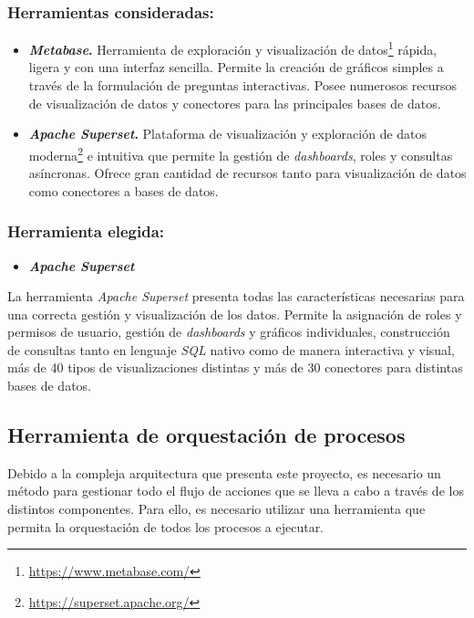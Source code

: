 \subsubsection{Herramientas consideradas:}

\begin{itemize}
    \item \textbf{\textit{Metabase}.} Herramienta de exploración y visualización de datos\footnote{\url{https://www.metabase.com/}} rápida, ligera y con una interfaz sencilla. Permite la creación de gráficos simples a través de la formulación de preguntas interactivas. Posee numerosos recursos de visualización de datos y conectores para las principales bases de datos. 
    
    \item \textbf{\textit{Apache Superset}.} Plataforma de visualización y exploración de datos moderna\footnote{\url{https://superset.apache.org/}} e intuitiva que permite la gestión de \textit{dashboards}, roles y consultas asíncronas. Ofrece gran cantidad de recursos tanto para visualización de datos como conectores a bases de datos.
\end{itemize}

\subsubsection{Herramienta elegida:}

\begin{itemize}
    \item \textbf{\textit{Apache Superset}}
\end{itemize}

La herramienta \textit{Apache Superset} presenta todas las características necesarias para una correcta gestión y visualización de los datos. Permite la asignación de roles y permisos de usuario, gestión de \textit{dashboards} y gráficos individuales, construcción de consultas tanto en lenguaje \textit{SQL} nativo como de manera interactiva y visual, más de 40 tipos de visualizaciones distintas y más de 30 conectores para distintas bases de datos.

\subsection{Herramienta de orquestación de procesos}

Debido a la compleja arquitectura que presenta este proyecto, es necesario un método para gestionar todo el flujo de acciones que se lleva a cabo a través de los distintos componentes. Para ello, es necesario utilizar una herramienta que permita la orquestación de todos los procesos a ejecutar.

